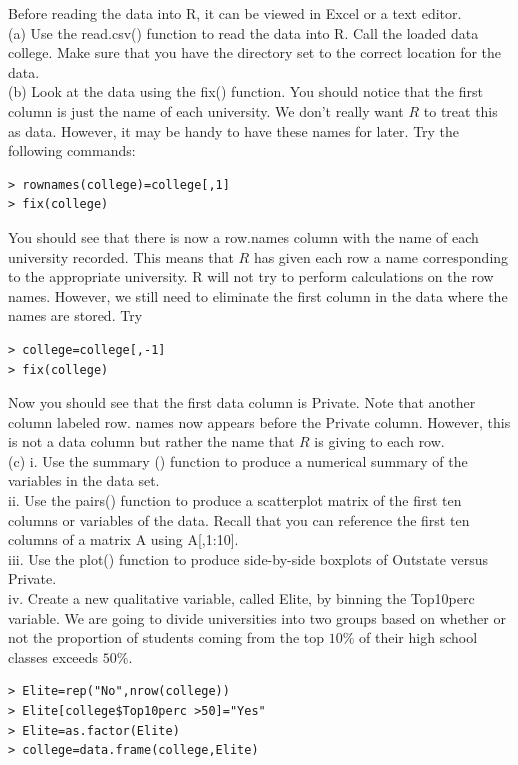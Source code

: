 \documentclass[10pt]{article}
\begin{document}
Before reading the data into R, it can be viewed in Excel or a text editor.\\
(a) Use the read.csv() function to read the data into R. Call the loaded data college. Make sure that you have the directory set to the correct location for the data.\\
(b) Look at the data using the fix() function. You should notice that the first column is just the name of each university. We don't really want $R$ to treat this as data. However, it may be handy to have these names for later. Try the following commands:

\begin{verbatim}
> rownames(college)=college[,1]
> fix(college)
\end{verbatim}

You should see that there is now a row.names column with the name of each university recorded. This means that $R$ has given each row a name corresponding to the appropriate university. R will not try to perform calculations on the row names. However, we still need to eliminate the first column in the data where the names are stored. Try

\begin{verbatim}
> college=college[,-1]
> fix(college)
\end{verbatim}

Now you should see that the first data column is Private. Note that another column labeled row. names now appears before the Private column. However, this is not a data column but rather the name that $R$ is giving to each row.\\
(c) i. Use the summary () function to produce a numerical summary of the variables in the data set.\\[0pt]
ii. Use the pairs() function to produce a scatterplot matrix of the first ten columns or variables of the data. Recall that you can reference the first ten columns of a matrix A using A[,1:10].\\
iii. Use the plot() function to produce side-by-side boxplots of Outstate versus Private.\\
iv. Create a new qualitative variable, called Elite, by binning the Top10perc variable. We are going to divide universities into two groups based on whether or not the proportion of students coming from the top $10 \%$ of their high school classes exceeds $50 \%$.

\begin{verbatim}
> Elite=rep("No",nrow(college))
> Elite[college$Top10perc >50]="Yes"
> Elite=as.factor(Elite)
> college=data.frame(college,Elite)
\end{verbatim}
\end{document}
